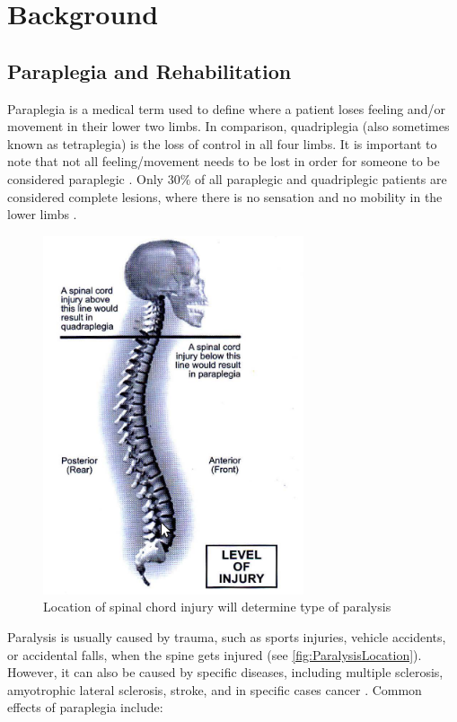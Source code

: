 \chapter{Background}

\section{Paraplegia and Rehabilitation}
Paraplegia is a medical term used to define where a patient loses feeling and/or movement in their lower two limbs. In comparison, quadriplegia (also sometimes known as tetraplegia) is the loss of control in all four limbs. It is important to note that not all feeling/movement needs to be lost in order for someone to be considered paraplegic \cite{IncompleteTraumaticQuadrilegia}. Only 30\% of all paraplegic and quadriplegic patients are considered complete lesions, where there is no sensation and no mobility in the lower limbs \cite{RehabParaplegia}. 

\begin{figure} [ht!]
    \centering
    \includegraphics[width=0.5\linewidth]{Figures/Background/ParaQuadInjuryLocs.png}
    \caption{Location of spinal chord injury will determine type of paralysis \cite{RehabParaplegia}}
    \label{fig:ParalysisLocation}
\end{figure}

Paralysis is usually caused by trauma, such as sports injuries, vehicle accidents, or accidental falls, when the spine gets injured (see \autoref{fig:ParalysisLocation}). However, it can also be caused by specific diseases, including multiple sclerosis, amyotrophic lateral sclerosis, stroke, and in specific cases cancer \cite{CausesParaplegia}. Common effects of paraplegia include:
 
